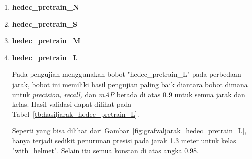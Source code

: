\begin{enumerate}
  \item \textbf{hedec\_pretrain\_N}
  \item \textbf{hedec\_pretrain\_S}
  \item \textbf{hedec\_pretrain\_M}
  \item \textbf{hedec\_pretrain\_L}
  
  \par Pada pengujian menggunakan bobot "hedec\_pretrain\_L" pada perbedaan jarak, bobot ini memiliki hasil pengujian
  paling baik diantara bobot dimana untuk \emph{precision, recall,} dan \emph{mAP} berada di atas 0.9 untuk semua jarak
  dan kelas. Hasil validasi dapat dilihat pada Tabel~\ref{tb:hasiljarak_hedec_pretrain_L}.

  \par Seperti yang bisa dilihat dari Gambar~\ref{fig:grafvaljarak_hedec_pretrain_L}, hanya terjadi sedikit penurunan presisi
  pada jarak 1.3 meter untuk kelas "with\_helmet". Selain itu semua konstan di atas angka 0.98.


\end{enumerate}
